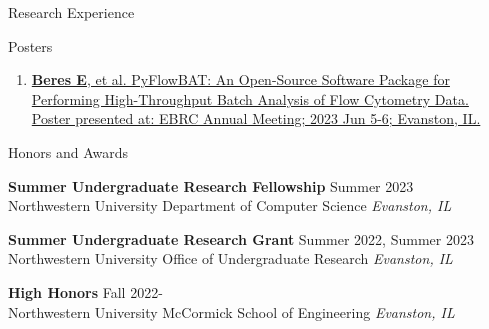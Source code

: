 \documentclass{resume} %
\begin{document}
\begin{rSection}{Research Experience}

\end{rSection} 


\begin{rSection}{Posters}



\begin{enumerate}
    \item \href{https://raw.githubusercontent.com/ellifteria/ellifteria.github.io/main/static/images/linked/ebrc-2023-poster.png}{\textbf{Beres E}, et al. PyFlowBAT: An Open-Source Software Package for Performing High-Throughput Batch Analysis of Flow Cytometry Data. Poster presented at: EBRC Annual Meeting; 2023 Jun 5-6; Evanston, IL.}
\end{enumerate}


\end{rSection} 


\begin{rSection}{Honors and Awards}

\textbf{Summer Undergraduate Research Fellowship} \hfill Summer 2023 \\
     Northwestern University Department of Computer Science \hfill \textit{Evanston, IL}
     
\textbf{Summer Undergraduate Research Grant} \hfill Summer 2022, Summer 2023 \\
     Northwestern University Office of Undergraduate Research \hfill \textit{Evanston, IL}
     
\textbf{High Honors} \hfill Fall 2022- \\
     Northwestern University McCormick School of Engineering \hfill \textit{Evanston, IL}

\end{rSection}
\end{document}
